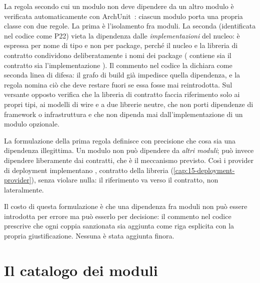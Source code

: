 La regola secondo cui un modulo non deve dipendere da un altro modulo \`e
verificata automaticamente con ArchUnit~\cite{archunit}: ciascun modulo porta
una propria classe  con due regole. La prima
\`e l'isolamento fra moduli. La seconda (identificata nel codice come P22) vieta
la dipendenza dalle \emph{implementazioni} del nucleo: \`e espressa per nome
di tipo e non per package, perch\'e il nucleo e la libreria di contratto
condividono deliberatamente i nomi dei package (
contiene sia il contratto  sia l'implementazione
). Il commento nel codice la dichiara come seconda linea di
difesa: il grafo di build gi\`a impedisce quella dipendenza, e la regola
nomina ci\`o che deve restare fuori se essa fosse mai reintrodotta. Sul
versante opposto  verifica che la libreria di contratto
faccia riferimento solo ai propri tipi, ai modelli di wire e a due librerie
neutre, che non porti dipendenze di framework o infrastruttura e che non dipenda
mai dall'implementazione di un modulo opzionale.

La formulazione della prima regola definisce con precisione che cosa sia una
dipendenza illegittima. Un modulo non pu\`o dipendere da \emph{altri moduli};
pu\`o invece dipendere liberamente dai contratti, che \`e il meccanismo previsto.
Cos\`i i provider di deployment implementano , contratto
della libreria  (\cref{cap:15-deployment-provider}),
senza violare nulla: il riferimento va verso il contratto, non lateralmente.

Il costo di questa formulazione \`e che una dipendenza fra moduli non pu\`o
essere introdotta per errore ma pu\`o esserlo per decisione: il commento nel
codice prescrive che ogni coppia sanzionata sia aggiunta come riga esplicita con
la propria giustificazione. Nessuna \`e stata aggiunta finora.

\section{Il catalogo dei moduli}

